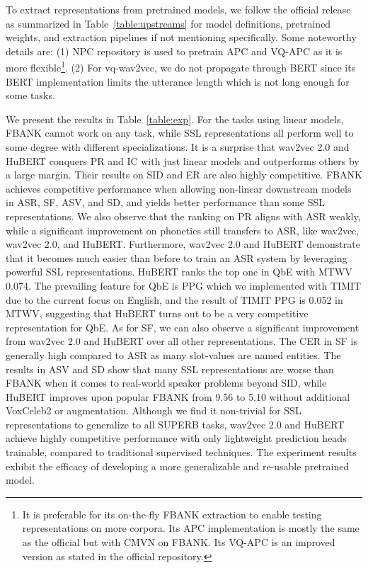 \documentclass[a4paper]{article}
\begin{document}
To extract representations from pretrained models, we follow the official release as summarized in Table~\ref{table:upstreams} for model definitions, pretrained weights, and extraction pipelines if not mentioning specifically.
Some noteworthy details are:
(1) NPC repository is used to pretrain APC and VQ-APC as it is more flexible\footnote{It is preferable for its on-the-fly FBANK extraction to enable testing representations on more corpora. Its APC implementation is mostly the same as the official but with CMVN on FBANK. Its VQ-APC is an improved version as stated in the official repository.}.
(2) For vq-wav2vec, we do not propagate through BERT since its BERT implementation limits the utterance length which is not long enough for some tasks.

We present the results in Table~\ref{table:exp}.
For the tasks using linear models, FBANK cannot work on any task, while SSL representations all perform well to some degree with different specializations.
It is a surprise that wav2vec 2.0 and HuBERT conquers PR and IC with just linear models and outperforms others by a large margin.
Their results on SID and ER are also highly competitive.
FBANK achieves competitive performance when allowing non-linear downstream models in ASR, SF, ASV, and SD, and yields better performance than some SSL representations.
We also observe that the ranking on PR aligns with ASR weakly, while a significant improvement on phonetics still transfers to ASR, like wav2vec, wav2vec 2.0, and HuBERT.
Furthermore, wav2vec 2.0 and HuBERT demonstrate that it becomes much easier than before to train an ASR system by leveraging powerful SSL representations.
HuBERT ranks the top one in QbE with MTWV 0.074.
The prevailing feature for QbE is PPG which we implemented with TIMIT due to the current focus on English, and the result of TIMIT PPG is 0.052 in MTWV, suggesting that HuBERT turns out to be a very competitive representation for QbE.
As for SF, we can also observe a significant improvement from wav2vec 2.0 and HuBERT over all other representations.
The CER in SF is generally high compared to ASR as many slot-values are named entities.
The results in ASV and SD show that many SSL representations are worse than FBANK when it comes to real-world speaker problems beyond SID, while HuBERT improves upon popular FBANK from 9.56 to 5.10 without additional VoxCeleb2 or augmentation.
Although we find it non-trivial for SSL representations to generalize to all SUPERB tasks, wav2vec 2.0 and HuBERT achieve highly competitive performance with only lightweight prediction heads trainable, compared to traditional supervised techniques. The experiment results exhibit the efficacy of developing a more generalizable and re-usable pretrained model.
\end{document}
